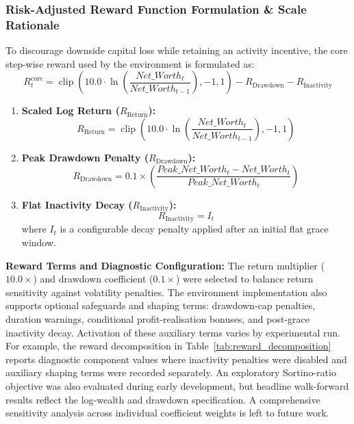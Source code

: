 \documentclass[11pt,a4paper]{article}
\begin{document}
\subsubsection{Risk-Adjusted Reward Function Formulation \& Scale Rationale}
To discourage downside capital loss while retaining an activity incentive, the core step-wise reward used by the environment is formulated as:
\begin{equation}
R_t^{\mathrm{core}} = \operatorname{clip}\left(10.0 \cdot \ln\left(\frac{Net\_Worth_t}{Net\_Worth_{t-1}}\right),-1,1\right) - R_{\text{Drawdown}} - R_{\text{Inactivity}}
\end{equation}
\begin{enumerate}[leftmargin=2em]
    \item \textbf{Scaled Log Return ($R_{\text{Return}}$):}
    \begin{equation}
    R_{\text{Return}} = \operatorname{clip}\left(10.0 \cdot \ln\left(\frac{Net\_Worth_t}{Net\_Worth_{t-1}}\right),-1,1\right)
    \end{equation}
    \item \textbf{Peak Drawdown Penalty ($R_{\text{Drawdown}}$):}
    \begin{equation}
    R_{\text{Drawdown}} = 0.1 \times \left( \frac{Peak\_Net\_Worth_t - Net\_Worth_t}{Peak\_Net\_Worth_t} \right)
    \end{equation}
    \item \textbf{Flat Inactivity Decay ($R_{\text{Inactivity}}$):}
    \begin{equation}
    R_{\text{Inactivity}} = I_t
    \end{equation}
    where $I_t$ is a configurable decay penalty applied after an initial flat grace window.
\end{enumerate}

\textbf{Reward Terms and Diagnostic Configuration:} The return multiplier ($10.0\times$) and drawdown coefficient ($0.1\times$) were selected to balance return sensitivity against volatility penalties. The environment implementation also supports optional safeguards and shaping terms: drawdown-cap penalties, duration warnings, conditional profit-realisation bonuses, and post-grace inactivity decay. Activation of these auxiliary terms varies by experimental run. For example, the reward decomposition in Table~\ref{tab:reward_decomposition} reports diagnostic component values where inactivity penalties were disabled and auxiliary shaping terms were recorded separately. An exploratory Sortino-ratio objective was also evaluated during early development, but headline walk-forward results reflect the log-wealth and drawdown specification. A comprehensive sensitivity analysis across individual coefficient weights is left to future work.
\end{document}

